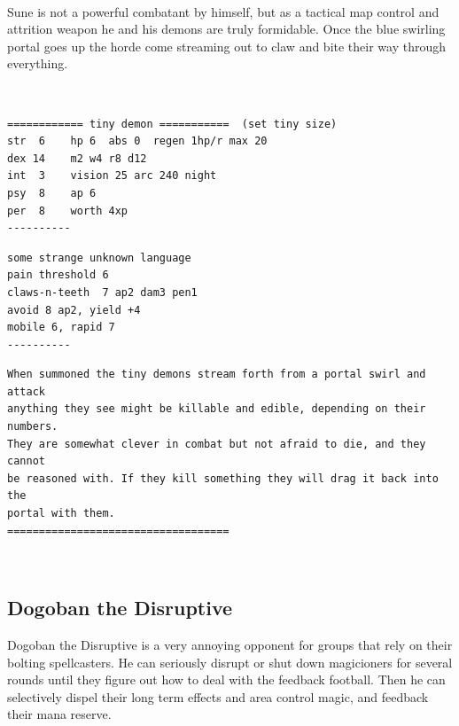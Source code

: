 \

Sune is not a powerful combatant by himself, but as a tactical map control and attrition weapon he and his demons are truly formidable. Once the blue swirling portal goes up the horde come streaming out to claw and bite their way through everything.

\

\goodbreak \small \begin{samepage} \begin{verbatim}
============ tiny demon ===========  (set tiny size)
str  6    hp 6  abs 0  regen 1hp/r max 20
dex 14    m2 w4 r8 d12
int  3    vision 25 arc 240 night
psy  8    ap 6
per  8    worth 4xp
----------
\end{verbatim} \goodbreak \begin{verbatim}
some strange unknown language
pain threshold 6
claws-n-teeth  7 ap2 dam3 pen1
avoid 8 ap2, yield +4
mobile 6, rapid 7
----------
\end{verbatim} \goodbreak \begin{verbatim}
When summoned the tiny demons stream forth from a portal swirl and attack
anything they see might be killable and edible, depending on their numbers.
They are somewhat clever in combat but not afraid to die, and they cannot
be reasoned with. If they kill something they will drag it back into the
portal with them.
===================================
\end{verbatim} \end{samepage} \normalsize

\


\goodbreak
\subsection*{Dogoban the Disruptive}
\label{dogobanthedisruptive}

Dogoban the Disruptive is a very annoying opponent for groups that rely on their bolting spellcasters. He can seriously disrupt or shut down magicioners for several rounds until they figure out how to deal with the feedback football. Then he can selectively dispel their long term effects and area control magic, and feedback their mana reserve.

\

